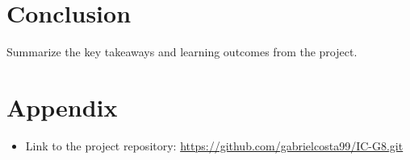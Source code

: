 \documentclass[a4paper,12pt]{article}
\begin{document}


\section{Conclusion}
Summarize the key takeaways and learning outcomes from the project.

\section{Appendix}
\begin{itemize}
    \item Link to the project repository: \url{https://github.com/gabrielcosta99/IC-G8.git}
\end{itemize}
\end{document}
